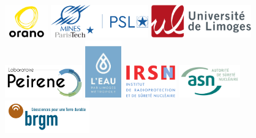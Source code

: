 \documentclass{article}
\begin{document}
\begin{center}
\includegraphics[height = 40pt]{oranologo.png}
\hspace{0.3em}
\includegraphics[height = 40pt ]{logoMPT.png}
\hspace{0.3em}
\includegraphics[height = 40pt ]{logoUNILIM.png}
\hspace{0.3em}
\includegraphics[height = 40pt ]{Logo-PEIRENE.png}
\vspace{2 cm}
\includegraphics[height = 70pt ]{logoeaulimoges.png}
\hspace{0.3em}
\includegraphics[height = 40pt ]{logoIRSN.png} 
\hspace{0.3em}
\includegraphics[height = 40pt]{logo_ASN.png}
\hspace{0.3em}
\includegraphics[height = 40pt]{logo_BRGM.png}

\end{center}
\end{document}
